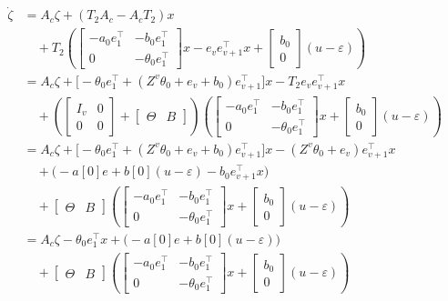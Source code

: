 \documentclass[12pt,a4paper]{article}
\begin{document}
\begin{align*}
\dot{\zeta} &= A_c \zeta + (T_2A_c - A_cT_2)x \\
&\quad + T_2 \left(
\left[
\begin{array}{c|c}
-a_0e_1^\top & -b_0e_1^\top \\ \hline
0 & -\theta_0e_1^\top
\end{array}
\right] x
- e_v e_{v+1}^\top x +
\begin{bmatrix} b_0 \\ 0 \end{bmatrix} (u-\varepsilon)
\right) \\
&= A_c \zeta +
\bigl[-\theta_0 e_1^\top + (Z^v\theta_0 + e_v + b_0)e_{v+1}^\top\bigr] x
- T_2 e_v e_{v+1}^\top x \\
&\quad + \left(
\begin{bmatrix} I_v & 0 \\ 0 & 0 \end{bmatrix} +
\left[\begin{array}{c|c} \Theta & B \end{array}\right]
\right)
\left(
\left[
\begin{array}{c|c}
-a_0e_1^\top & -b_0e_1^\top \\ \hline
0 & -\theta_0e_1^\top
\end{array}
\right] x
+ \begin{bmatrix} b_0 \\ 0 \end{bmatrix} (u-\varepsilon)
\right) \\
&= A_c \zeta +
\bigl[-\theta_0 e_1^\top + (Z^v\theta_0 + e_v + b_0)e_{v+1}^\top\bigr] x
- (Z^v\theta_0 + e_v)e_{v+1}^\top x \\
&\quad + \bigl(-a[0]e + b[0](u-\varepsilon) - b_0 e_{v+1}^\top x\bigr) \\
&\quad + \left[\begin{array}{c|c} \Theta & B \end{array}\right]
\left(
\left[
\begin{array}{c|c}
-a_0e_1^\top & -b_0e_1^\top \\ \hline
0 & -\theta_0e_1^\top
\end{array}
\right] x
+ \begin{bmatrix} b_0 \\ 0 \end{bmatrix} (u-\varepsilon)
\right) \\
&= A_c \zeta - \theta_0 e_1^\top x +
\bigl(-a[0]e + b[0](u-\varepsilon)\bigr) \\
&\quad + \left[\begin{array}{c|c} \Theta & B \end{array}\right]
\left(
\left[
\begin{array}{c|c}
-a_0e_1^\top & -b_0e_1^\top \\ \hline
0 & -\theta_0e_1^\top
\end{array}
\right] x
+ \begin{bmatrix} b_0 \\ 0 \end{bmatrix} (u-\varepsilon)
\right)
\end{align*}
\end{document}
